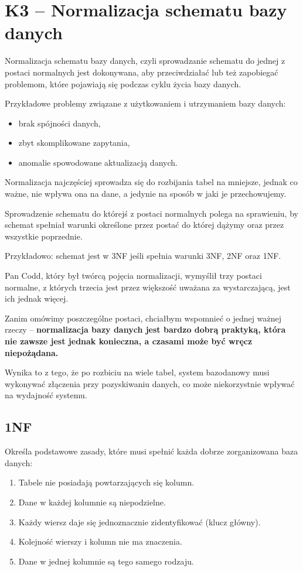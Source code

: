 \section{K3 -- Normalizacja schematu bazy danych}

Normalizacja schematu bazy danych, czyli sprowadzanie schematu do jednej z postaci normalnych jest dokonywana, aby przeciwdziałać lub też zapobiegać problemom, które pojawiają się podczas cyklu życia bazy danych.

Przykładowe problemy związane z użytkowaniem i utrzymaniem bazy danych:
\begin{itemize}
	\item{brak spójności danych,}
	\item{zbyt skomplikowane zapytania,}
	\item{anomalie spowodowane aktualizacją danych.}
\end{itemize}

Normalizacja najczęściej sprowadza się do rozbijania tabel na mniejsze, jednak co ważne, nie wpływa ona na dane, a jedynie na sposób w jaki je przechowujemy.

Sprowadzenie schematu do którejś z postaci normalnych polega na sprawieniu, by schemat spełniał warunki określone przez postać do której dążymy oraz przez wszystkie poprzednie.

Przykładowo: schemat jest w 3NF jeśli spełnia warunki 3NF, 2NF oraz 1NF.

Pan Codd, który był twórcą pojęcia normalizacji, wymyślił trzy postaci normalne, z których trzecia jest przez większość uważana za wystarczającą, jest ich jednak więcej.

Zanim omówimy poszczególne postaci, chciałbym wspomnieć o jednej ważnej rzeczy -- \textbf{normalizacja bazy danych jest bardzo dobrą praktyką, która nie zawsze jest jednak konieczna, a czasami może być wręcz niepożądana.}

Wynika to z tego, że po rozbiciu na wiele tabel, system bazodanowy musi wykonywać złączenia przy pozyskiwaniu danych, co może niekorzystnie wpływać na wydajność systemu.
\subsection*{1NF}
	Określa podstawowe zasady, które musi spełnić każda dobrze zorganizowana baza danych:
\begin{enumerate}
	\item{Tabele nie posiadają powtarzających się kolumn.}
	\item{Dane w każdej kolumnie są niepodzielne.}
	\item{Każdy wiersz daje się jednoznacznie zidentyfikować (klucz główny).}
	\item{Kolejność wierszy i kolumn nie ma znaczenia.}
	\item{Dane w jednej kolumnie są tego samego rodzaju.}
\end{enumerate}

